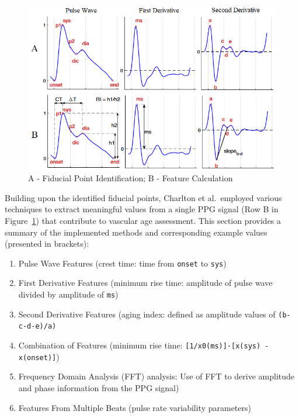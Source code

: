 \begin{figure}[h]
    \centering
    \includegraphics[scale=0.8]{images/sp/fiducials}
    \caption{A - Fiducial Point Identification; B - Feature Calculation~\cite{charltonAssessingHemodynamicsPhotoplethysmogram2022}}
    \label{fig:fiducials}
\end{figure}

Building upon the identified fiducial points, Charlton et al.\ employed various techniques to extract meaningful values from a single PPG signal (Row B in Figure~\ref{fig:fiducials}) that contribute to vascular age assessment.
This section provides a summary of the implemented methods and corresponding example values (presented in brackets):
\begin{enumerate}
    \setlength{\itemsep}{-0.2\parsep}
    \item Pulse Wave Features (crest time: time from \texttt{onset} to \texttt{sys})
    \item First Derivative Features (minimum rise time: amplitude of pulse wave divided by amplitude of \texttt{ms})
    \item Second Derivative Features (aging index: defined as amplitude values of \mbox{\texttt{(b-c-d-e)/a)}}
    \item Combination of Features (minimum rise time: \texttt{[1/x0(ms)]·[x(sys) - x(onset)]})
    \item Frequency Domain Analysis (\ac{FFT}) analysis: Use of FFT to derive amplitude and phase information from the PPG signal)
    \item Features From Multiple Beats (pulse rate variability parameters)
\end{enumerate}


